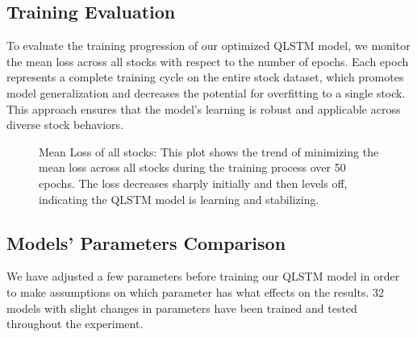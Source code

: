 \subsection{Training Evaluation}
To evaluate the training progression of our optimized QLSTM model, we monitor the mean loss across all stocks with respect to the number of epochs. Each epoch represents a complete training cycle on the entire stock dataset, which promotes model generalization and decreases the potential for overfitting to a single stock. This approach ensures that the model's learning is robust and applicable across diverse stock behaviors.

\begin{figure}[!htbp]
  \centering
 \caption{Mean Loss of all stocks: This plot shows the trend of minimizing the mean loss across all stocks during the training process over 50 epochs. The loss decreases sharply initially and then levels off, indicating the QLSTM model is learning and stabilizing.}
 \label{fig:TrainMeanLoss}
\end{figure}

\subsection{Models' Parameters Comparison}
We have adjusted a few parameters before training our QLSTM model in order to make assumptions on which parameter has what effects on the results. 32 models with slight changes in parameters have been trained and tested throughout the experiment. 


